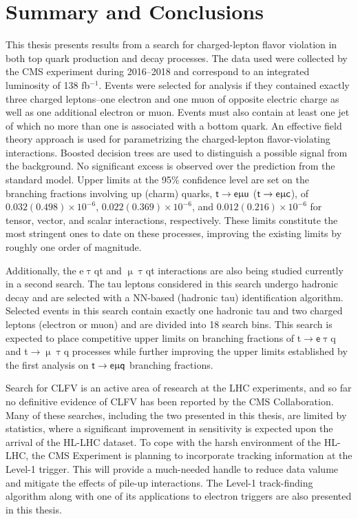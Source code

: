 \chapter{Summary and Conclusions}
\label{chap:Conclusion}

This thesis presents results from a search for charged-lepton flavor violation in both top quark production and decay processes. The data used were collected by the \ac{CMS} experiment during 2016--2018 and correspond to an integrated luminosity of 138 fb$^{-1}$. Events were selected for analysis if they contained exactly three charged leptons--one electron and one muon of opposite electric charge as well as one additional electron or muon. Events must also contain at least one jet of which no more than one is associated with a bottom quark. An effective field theory approach is used for parametrizing the charged-lepton flavor-violating interactions. Boosted decision trees are used to distinguish a possible signal from the background. No significant excess is observed over the prediction from the standard model. Upper limits at the 95\% confidence level are set on the branching fractions involving up (charm) quarks, $\textsf{t}\rightarrow\textsf{e}\upmu\textsf{u}$ ($\textsf{t}\rightarrow\textsf{e}\upmu\textsf{c}$), of $0.032 (0.498) \times 10^{-6}$, $0.022 (0.369) \times 10^{-6}$, and $0.012 (0.216) \times 10^{-6}$ for tensor, vector, and scalar interactions, respectively. These limits constitute the most stringent ones to date on these processes, improving the existing limits by roughly one order of magnitude.

Additionally, the e$\uptau$qt and $\upmu\uptau$qt interactions are also being studied currently in a second search. The tau leptons considered in this search undergo hadronic decay and are selected with a \ac{NN}-based (hadronic tau) identification algorithm. Selected events in this search contain exactly one hadronic tau and two charged leptons (electron or muon) and are divided into 18 search bins. This search is expected to place competitive upper limits on branching fractions of t$\rightarrow\textsf{e}\uptau$q and t$\rightarrow\upmu\uptau$q processes while further improving the upper limits established by the first analysis on $\textsf{t}\rightarrow\textsf{e}\upmu\textsf{q}$ branching fractions. 

Search for \ac{CLFV} is an active area of research at the \ac{LHC} experiments, and so far no definitive evidence of \ac{CLFV} has been reported by the \ac{CMS} Collaboration. Many of these searches, including the two presented in this thesis, are limited by statistics, where a significant improvement in sensitivity is expected upon the arrival of the \ac{HL-LHC} dataset. To cope with the harsh environment of the \ac{HL-LHC}, the \ac{CMS} Experiment is planning to incorporate tracking information at the Level-1 trigger. This will provide a much-needed handle to reduce data valume and mitigate the effects of pile-up interactions. The Level-1 track-finding algorithm along with one of its applications to electron triggers are also presented in this thesis.